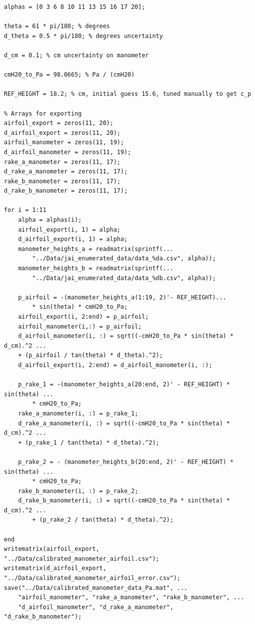 \documentclass[runningheads]{llncs}
\begin{document}
\begin{verbatim}
alphas = [0 3 6 8 10 11 13 15 16 17 20];

theta = 61 * pi/180; % degrees
d_theta = 0.5 * pi/180; % degrees uncertainty

d_cm = 0.1; % cm uncertainty on manometer

cmH20_to_Pa = 98.0665; % Pa / (cmH20)

REF_HEIGHT = 18.2; % cm, initial guess 15.6, tuned manually to get c_p

% Arrays for exporting
airfoil_export = zeros(11, 20);
d_airfoil_export = zeros(11, 20);
airfoil_manometer = zeros(11, 19);
d_airfoil_manometer = zeros(11, 19);
rake_a_manometer = zeros(11, 17);
d_rake_a_manometer = zeros(11, 17);
rake_b_manometer = zeros(11, 17);
d_rake_b_manometer = zeros(11, 17);

for i = 1:11
    alpha = alphas(i);
    airfoil_export(i, 1) = alpha;
    d_airfoil_export(i, 1) = alpha;
    manometer_heights_a = readmatrix(sprintf(...
        "../Data/jai_enumerated_data/data_%da.csv", alpha));
    manometer_heights_b = readmatrix(sprintf(...
        "../Data/jai_enumerated_data/data_%db.csv", alpha));
    
    p_airfoil = -(manometer_heights_a(1:19, 2)'- REF_HEIGHT)...
        * sin(theta) * cmH20_to_Pa;
    airfoil_export(i, 2:end) = p_airfoil;
    airfoil_manometer(i,:) = p_airfoil;
    d_airfoil_manometer(i, :) = sqrt((-cmH20_to_Pa * sin(theta) * d_cm).^2 ...
    + (p_airfoil / tan(theta) * d_theta).^2);
    d_airfoil_export(i, 2:end) = d_airfoil_manometer(i, :);
    
    p_rake_1 = -(manometer_heights_a(20:end, 2)' - REF_HEIGHT) * sin(theta) ...
        * cmH20_to_Pa;
    rake_a_manometer(i, :) = p_rake_1;
    d_rake_a_manometer(i, :) = sqrt((-cmH20_to_Pa * sin(theta) * d_cm).^2 ...
    + (p_rake_1 / tan(theta) * d_theta).^2);
    
    p_rake_2 = - (manometer_heights_b(20:end, 2)' - REF_HEIGHT) * sin(theta) ...
        * cmH20_to_Pa;
    rake_b_manometer(i, :) = p_rake_2;
    d_rake_b_manometer(i, :) = sqrt((-cmH20_to_Pa * sin(theta) * d_cm).^2 ...
        + (p_rake_2 / tan(theta) * d_theta).^2);
    
end
writematrix(airfoil_export, "../Data/calibrated_manometer_airfoil.csv");
writematrix(d_airfoil_export, "../Data/calibrated_manometer_airfoil_error.csv");
save("../Data/calibrated_manometer_data_Pa.mat", ...
    "airfoil_manometer", "rake_a_manometer", "rake_b_manometer", ...
    "d_airfoil_manometer", "d_rake_a_manometer", "d_rake_b_manometer");
\end{verbatim}
\end{document}

